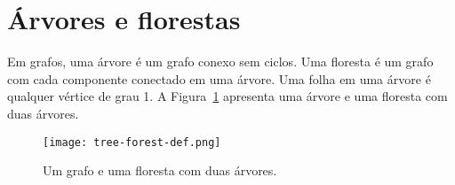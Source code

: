 \section{Árvores e florestas}
Em grafos, uma árvore é um grafo conexo sem ciclos. Uma floresta é um grafo com cada componente conectado em uma árvore. Uma folha em uma árvore é qualquer vértice de grau 1. A Figura~\ref{sec2:tree-forest-def} apresenta uma árvore e uma floresta com duas árvores.

\begin{figure}
    \centering
    \texttt{[image: tree-forest-def.png]}
    \caption{Um grafo e uma floresta com duas árvores.}
    \label{sec2:tree-forest-def}
\end{figure}

